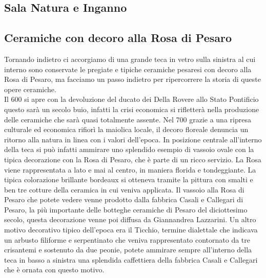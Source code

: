 \documentclass[hidelinks,12pt,a4paper]{article}
\begin{document}
\begin{flushleft}
		\section{Sala Natura e Inganno}
		
		\subsection{Ceramiche con decoro alla Rosa di Pesaro}
		Tornando indietro ci accorgiamo di una grande teca in vetro sulla sinistra al cui interno sono conservate le pregiate e tipiche ceramiche pesaresi con decoro alla Rosa di Pesaro, ma facciamo un passo indietro per ripercorrere la storia di queste opere ceramiche.\\
		Il 600 si apre con la devoluzione del ducato dei Della Rovere allo Stato Pontificio questo sarà un secolo buio, infatti la crisi economica si rifletterà nella produzione delle ceramiche che sarà quasi totalmente assente. Nel 700 grazie a una ripresa culturale ed economica rifiorì la maiolica locale, il decoro floreale denuncia un ritorno alla natura in linea con i valori dell'epoca. In posizione centrale all'interno della teca si può infatti ammirare uno splendido esempio di vassoio ovale con la tipica decorazione con la Rosa di Pesaro, che è parte di un ricco servizio. La Rosa viene rappresentata a lato e mai al centro, in maniera florida e tondeggiante. La tipica colorazione brillante bordeaux si otteneva tramite la pittura con smalti e ben tre cotture della ceramica in cui veniva applicata. Il vassoio alla Rosa di Pesaro che potete vedere venne prodotto dalla fabbrica Casali e Callegari di Pesaro, la più importante delle botteghe ceramiche di Pesaro del diciottesimo secolo, questa decorazione venne poi diffusa da Giannandrea Lazzarini. Un altro motivo decorativo tipico dell'epoca era il Ticchio, termine dialettale che indicava un arbusto filiforme e serpentinato che veniva rappresentato contornato da tre crisantemi e sostenuto da due peonie, potete ammirare sempre all'interno della teca in basso a sinistra una splendida caffettiera della fabbrica Casali e Callegari che è ornata con questo motivo.
		

\end{flushleft}
\end{document}
